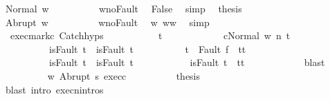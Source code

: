 \begin{isabellebody}
\ {\isacharparenleft}Normal\ w{\isacharprime}{\isacharprime}{\isacharparenright}\isanewline
\ \ \ \ \ \ \ \ \isamarkupfalse%
\ w{\isacharprime}{\isacharunderscore}noFault\ \isamarkupfalse%
\ False\ \isamarkupfalse%
\ simp\ \isamarkupfalse%
\ {\isacharquery}thesis\ \isacommand{{\isachardot}{\isachardot}}\isamarkupfalse%
\isanewline
\ \ \ \ \ \ \isamarkupfalse%
\isanewline
\ \ \ \ \ \ \ \ \isamarkupfalse%
\ {\isacharparenleft}Abrupt\ w{\isacharprime}{\isacharprime}{\isacharparenright}\isanewline
\ \ \ \ \ \ \ \ \isamarkupfalse%
\ w{\isacharprime}{\isacharunderscore}noFault\ \isamarkupfalse%
\ w{\isacharprime}{\isacharprime}{\isacharcolon}\ {\isachardoublequoteopen}w{\isacharprime}{\isacharprime}{\isacharequal}w{\isachardoublequoteclose}\ \isamarkupfalse%
\ simp\isanewline
\ \ \ \ \ \ \ \ \isamarkupfalse%
\ \ exec{\isacharunderscore}mark{\isacharunderscore}c{}\ Catch{\isachardot}hyps\ \isanewline
\ \ \ \ \ \ \ \ \isamarkupfalse%
\ t{\isacharprime}\ \ \isanewline
\ \ \ \ \ \ \ \ \ \ {\isachardoublequoteopen}{\isasymGamma}{\isasymturnstile}{\isasymlangle}c{}{\isacharcomma}Normal\ w{\isasymrangle}\ {\isacharequal}n{\isasymRightarrow}\ t{\isacharprime}{\isachardoublequoteclose}\isanewline
\ \ \ \ \ \ \ \ \ \ {\isachardoublequoteopen}isFault\ t\ {\isasymlongrightarrow}\ isFault\ t{\isacharprime}{\isachardoublequoteclose}\isanewline
\ \ \ \ \ \ \ \ \ \ {\isachardoublequoteopen}t{\isacharprime}\ {\isacharequal}\ Fault\ f\ {\isasymlongrightarrow}\ t{\isacharprime}{\isacharequal}t{\isachardoublequoteclose}\isanewline
\ \ \ \ \ \ \ \ \ \ {\isachardoublequoteopen}isFault\ t{\isacharprime}\ {\isasymlongrightarrow}\ isFault\ t{\isachardoublequoteclose}\isanewline
\ \ \ \ \ \ \ \ \ \ {\isachardoublequoteopen}{\isasymnot}\ isFault\ t{\isacharprime}\ {\isasymlongrightarrow}\ t{\isacharprime}{\isacharequal}t{\isachardoublequoteclose}\isanewline
\ \ \ \ \ \ \ \ \ \ \isamarkupfalse%
\ blast\isanewline
\ \ \ \ \ \ \ \ \isamarkupfalse%
\ w{\isacharprime}{\isacharprime}\ Abrupt\ s\ exec{\isacharunderscore}c{}\isanewline
\ \ \ \ \ \ \ \ \isamarkupfalse%
\ {\isacharquery}thesis\isanewline
\ \ \ \ \ \ \ \ \ \ \isamarkupfalse%
\ {\isacharparenleft}blast\ intro{\isacharcolon}\ execn{\isachardot}intros{\isacharparenright}\isanewline
\ \ \ \ \ \ \isamarkupfalse%
\isanewline

\end{isabellebody}
